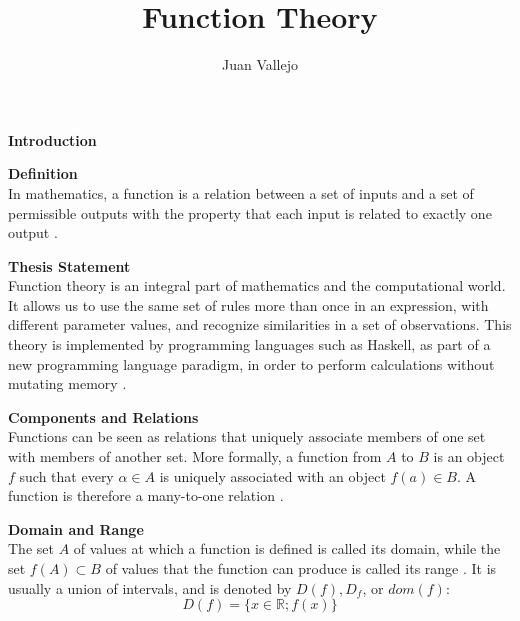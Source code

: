 \documentclass{amsart}
\title{Function Theory}
\author{Juan Vallejo}
\begin{document}
\maketitle

\begin{outline}
  \item {\bf Introduction }
  \begin{outline}
    \item {\bf Definition } \\
      In mathematics, a function is a relation between a set of inputs and a set of permissible outputs with the property that each input is related to exactly one output \cite{wolfram1}.
    \item {\bf Thesis Statement } \\
      Function theory is an integral part of mathematics and the computational world. It allows us to use the same set of rules more than once in an expression, with different parameter values, and recognize similarities in a set of observations. This theory is implemented by programming languages such as Haskell, as part of a new programming language paradigm, in order to perform calculations without mutating memory \cite{mathexchange2}.
  \end{outline}
  \item {\bf Components and Relations } \\
      Functions can be seen as relations that uniquely associate members of one set with members of another set. More formally, a function from $A$ to $B$ is an object $f$ such that every $\alpha \in A$ is uniquely associated with an object $f(a) \in B$. A function is therefore a many-to-one relation \cite{wolfram2}.
    \begin{outline}
      \item {\bf Domain and Range } \\
        The set $A$ of values at which a function is defined is called its domain, while the set $f(A) \subset B$ of values that the function can produce is called its range \cite{wolfram2}. It is usually a union of intervals, and is denoted by $D(f), D_f$, or $dom(f)$:
        \begin{equation*}
          D(f) = \lbrace x \in \mathbb{R}; f(x) \rbrace
        \end{equation*}


\end{outline}
\end{outline}
\end{document}
